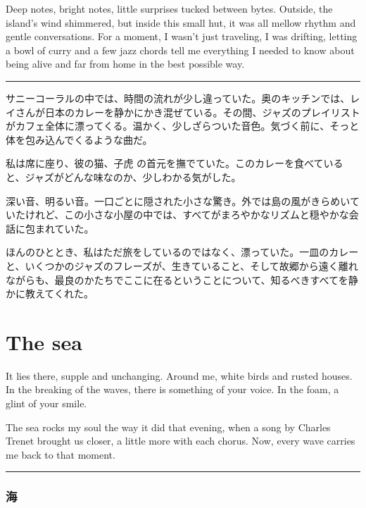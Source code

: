 \documentclass[
  letterpaper,
  oneside]{scrbook}
\begin{document}
Deep notes, bright notes, little surprises tucked between bytes.
Outside, the island's wind shimmered, but inside this small hut, it was
all mellow rhythm and gentle conversations. For a moment, I wasn't just
traveling, I was drifting, letting a bowl of curry and a few jazz chords
tell me everything I needed to know about being alive and far from home
in the best possible way.

\begin{center}\rule{0.5\linewidth}{0.5pt}\end{center}

サニーコーラルの中では、時間の流れが少し違っていた。奥のキッチンでは、レイさんが日本のカレーを静かにかき混ぜている。その間、ジャズのプレイリストがカフェ全体に漂ってくる。温かく、少しざらついた音色。気づく前に、そっと体を包み込んでくるような曲だ。

私は席に座り、彼の猫、子虎
の首元を撫でていた。このカレーを食べていると、ジャズがどんな味なのか、少しわかる気がした。

深い音、明るい音。一口ごとに隠された小さな驚き。外では島の風がきらめいていたけれど、この小さな小屋の中では、すべてがまろやかなリズムと穏やかな会話に包まれていた。

ほんのひととき、私はただ旅をしているのではなく、漂っていた。一皿のカレーと、いくつかのジャズのフレーズが、生きていること、そして故郷から遠く離れながらも、最良のかたちでここに在るということについて、知るべきすべてを静かに教えてくれた。


\chapter{The sea}\label{the-sea}

It lies there, supple and unchanging. Around me, white birds and rusted
houses. In the breaking of the waves, there is something of your voice.
In the foam, a glint of your smile.

The sea rocks my soul the way it did that evening, when a song by
Charles Trenet brought us closer, a little more with each chorus. Now,
every wave carries me back to that moment.

\begin{center}\rule{0.5\linewidth}{0.5pt}\end{center}

\subsection{海}\label{ux6d77}
\end{document}
